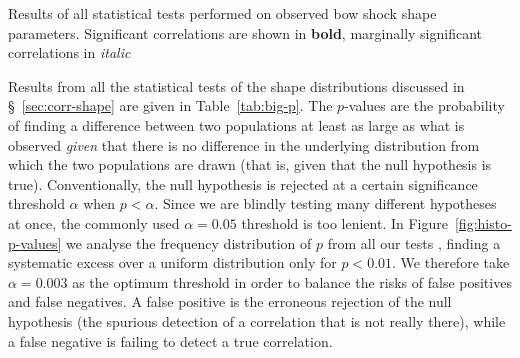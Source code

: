 \begin{table}
  \setlength\tabcolsep{2pt}
  \caption{Results of all statistical tests performed on observed bow
    shock shape parameters. Significant correlations are shown in
    \textbf{bold}, marginally significant correlations in
    \textit{italic}}
  \label{tab:big-p}
  
\end{table}

Results from all the statistical tests of the shape distributions
discussed in \S~\ref{sec:corr-shape} are given in
Table~\ref{tab:big-p}.  The \(p\)-values are the probability of
finding a difference between two populations at least as large as what
is observed \emph{given} that there is no difference in the underlying
distribution from which the two populations are drawn (that is, given
that the null hypothesis is true).  Conventionally, the null
hypothesis is rejected at a certain significance threshold \(\alpha\) when
\(p < \alpha\).  Since we are blindly testing many different hypotheses at
once, the commonly used \(\alpha = 0.05\) threshold is too lenient.  In
Figure~\ref{fig:histo-p-values} we analyse the frequency distribution
of \(p\) from all our tests \citep[see][]{Head:2015a}, finding a
systematic excess over a uniform distribution only for \(p < 0.01\).
We therefore take \(\alpha = 0.003\) as the optimum threshold in order to
balance the risks of false positives and false negatives. A false
positive is the erroneous rejection of the null hypothesis (the
spurious detection of a correlation that is not really there), while a
false negative is failing to detect a true correlation.


